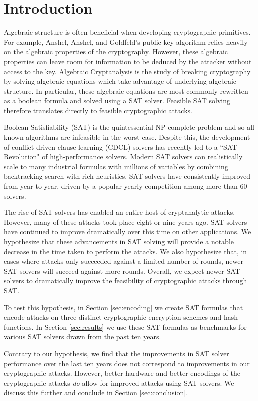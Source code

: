 \section{Introduction}

Algebraic structure is often beneficial when developing cryptographic primitives. For example, Anshel, Anshel, and Goldfeld's public key algorithm \cite{AAG99} relies heavily on the algebraic properties of the cryptography. However, these algebraic properties can leave room for information to be deduced by the attacker without access to the key. Algebraic Cryptanalysis \cite{Bard09} is the study of breaking cryptography by solving algebraic equations which take advantage of underlying algebraic structure. In particular, these algebraic equations are most commonly rewritten as a boolean formula and solved using a SAT solver. Feasible SAT solving therefore translates directly to feasible cryptographic attacks.

Boolean Satisfiability (SAT) is the quintessential NP-complete problem and so all known algorithms are infeasible in the worst case. Despite this, the development of conflict-driven clause-learning (CDCL) solvers has recently led to a ``SAT Revolution" of high-performance solvers. \cite{BHMW09} Modern SAT solvers can realistically scale to many industrial formulas with millions of variables by combining backtracking search with rich heuristics. \cite{MZ09} SAT solvers have consistently improved from year to year, driven by a popular yearly competition among more than 60 solvers. \cite{JLRS12}

The rise of SAT solvers has enabled an entire host of cryptanalytic attacks. However, many of these attacks took place  \cite{CB07,CNO08,DKV07,MCP07,MZ06} eight or nine years ago. SAT solvers have continued to improve dramatically over this time on other applications. We hypothesize that these advancements in SAT solving will provide a notable decrease in the time taken to perform the attacks. We also hypothesize that, in cases where attacks only succeeded against a limited number of rounds, newer SAT solvers will succeed against more rounds. Overall, we expect newer SAT solvers to dramatically improve the feasibility of cryptographic attacks through SAT.

To test this hypothesis, in Section \ref{sec:encoding} we create SAT formulas that encode attacks on three distinct cryptographic encryption schemes and hash functions. In Section \ref{sec:results} we use these SAT formulas as benchmarks for various SAT solvers drawn from the past ten years.

Contrary to our hypothesis, we find that the improvements in SAT solver performance over the last ten years does not correspond to improvements in our cryptographic attacks. However, better hardware and better encodings of the cryptographic attacks \emph{do} allow for improved attacks using SAT solvers. We discuss this further and conclude in Section \ref{sec:conclusion}.
